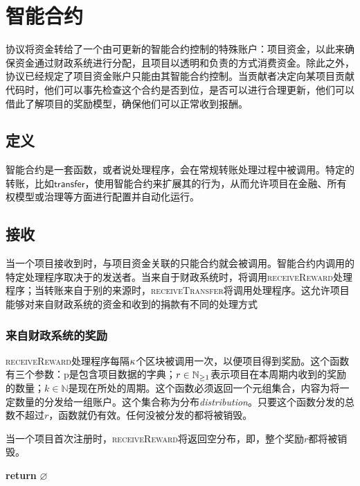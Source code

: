 \section{智能合约}
\label{s:smart-contracts}

\newcommand{\handler}[1]{\textsc{\small#1}}

\oscoin{}协议将资金转给了一个由可更新的智能合约控制的特殊账户：项目资金，以此来确保资金通过\oscoin{}财政系统进行分配，且项目以透明和负责的方式消费资金。除此之外，协议已经规定了项目资金账户只能由其智能合约控制。当贡献者决定向某项目贡献代码时，他们可以事先检查这个合约是否到位，是否可以进行合理更新，他们可以借此了解项目的奖励模型，确保他们可以正常收到报酬。

\subsection{定义}
智能合约是一套函数，或者说处理程序，会在常规转账处理过程中被调用。特定的转账，比如$\mathsf{transfer}$，使用智能合约来扩展其的行为，从而允许项目在金融、所有权模型或治理等方面进行配置并自动化运行。

\subsection{接收 \oscoin{}}

当一个项目接收到\oscoin{}时，与项目资金关联的只能合约就会被调用。智能合约内调用的特定处理程序取决于\oscoin{}的发送者。当\oscoin{}来自于财政系统时，将调用\handler{receiveReward}处理程序；当转账来自于别的来源时，\handler{receiveTransfer}将调用处理程序。这允许项目能够对来自财政系统的资金和收到的捐款有不同的处理方式

\subsubsection{来自财政系统的奖励}

\handler{receiveReward}处理程序每隔$\kappa$个区块被调用一次，以便项目得到奖励。这个函数有三个参数：p是包含项目数据的字典；$r \in \mathbb{N}_{\geq 1}$表示项目在本周期内收到的\oscoin{}奖励的数量；$k \in \mathbb{N}$是现在所处的周期。这个函数必须返回一个元组集合，内容为将一定数量的\oscoin{}分发给一组账户。这个集合称为分布\emph{distribution}。只要这个函数分发的\oscoin{}总数不超过$r$，函数就仍有效。任何没被分发的\oscoin{}都将被销毁。

当一个项目首次注册时，\handler{receiveReward}将返回空分布，即，整个奖励$r$都将被销毁。

\begin{algorithmic}[0]
        \State \textbf{return} $\varnothing$
    \EndProcedure
\end{algorithmic}

